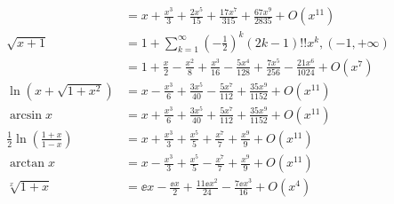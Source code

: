 \[\begin{aligned}
		                                           & = x + \frac{x^3}{3} + \frac{2x^5}{15} + \frac{17x^{7}}{315} + \frac{67x^9}{2835} + O(x^{11})                                                    \\
		\sqrt{x+1}                                 & = 1 + \sum_{k=1}^\infty \left(-\frac{1}{2}\right)^k (2k-1)!!x^k,(-1, +\infty)                                                                   \\
		                                           & = 1 + \frac{x}{2}-\frac{x^2}{8} +\frac{x^3}{16}-\frac{5 x^4}{128} +\frac{7 x^5}{256}   - \frac{21x^6}{1024}   +  O(x^{7})                       \\
		\ln(x + \sqrt{1+x^2})                      & = x - \frac{x^3}{6} + \frac{3x^5}{40} - \frac{5 x^7}{112} + \frac{35x^9}{1152}												+ O(x^{11})                                           \\
		\arcsin x                                  & = x + \frac{x^3}{6} + \frac{3x^5}{40} + \frac{5 x^7}{112} + \frac{35x^9}{1152}												+ O(x^{11})                                           \\
		\frac{1}{2}\ln\left(\frac{1+x}{1-x}\right) & = x + \frac{x^3}{3} + \frac{x^5}{5} + \frac{x^7}{7}													 + \frac{x^9}{9}		  + O(x^{11})                                                 \\
		\arctan x                                  & = x - \frac{x^3}{3} + \frac{x^5}{5} - \frac{x^7}{7}													 + \frac{x^9}{9}		  + O(x^{11})                                                 \\
		\sqrt[x]{1+x}                              & = \ee x - \frac{\ee x}{2} + \frac{11 \ee x^2}{24} - \frac{7 \ee x^3}{16}		  + O(x^{4})
	\end{aligned}
\]


